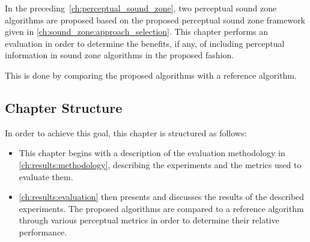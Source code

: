 In the preceding~\autoref{ch:perceptual_sound_zone}, two perceptual sound zone algorithms are proposed based on the proposed perceptual sound zone framework given in
\autoref{ch:sound_zone:approach_selection}.
This chapter performs an evaluation in order to determine the benefits, if any, of including perceptual information in sound zone algorithms 
in the proposed fashion.

This is done by comparing the proposed algorithms with a reference algorithm.

\subsection*{Chapter Structure}
In order to achieve this goal, this chapter is structured as follows:

\begin{itemize}
    \item This chapter begins with a description of the evaluation methodology in \autoref{ch:results:methodology}, describing the experiments 
        and the metrics used to evaluate them.
    \item \autoref{ch:results:evaluation} then presents and discusses the results of the described experiments. 
        The proposed algorithms are compared to a reference algorithm through various perceptual metrics in order to determine their relative performance.
\end{itemize}
